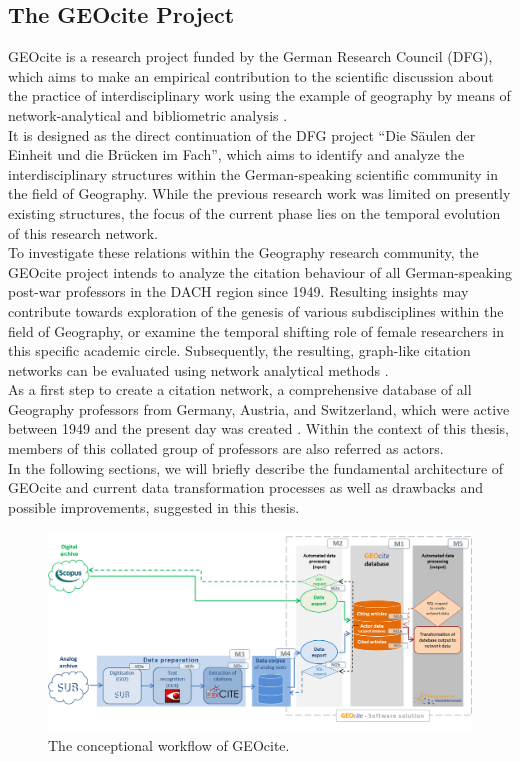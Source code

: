 \subsection*{The GEOcite Project}
GEOcite is a research project funded by the German Research Council (DFG), which aims to make an empirical contribution to the scientific discussion about the practice of interdisciplinary work using the example of geography by means of network-analytical and bibliometric analysis \cite{geocite}.\\
It is designed as the direct continuation of the DFG project \enquote{Die Säulen der Einheit und die Brücken im Fach}\cite{geocite_dfg}, which aims to identify and analyze the interdisciplinary structures within the German-speaking scientific community in the field of Geography. While the previous research work was limited on presently existing structures, the focus of the current phase lies on the temporal evolution of this research network.\\
To investigate these relations within the Geography research community, the GEOcite project intends to analyze the citation behaviour of all German-speaking post-war professors in the DACH region since 1949. Resulting insights may contribute towards exploration of the genesis of various subdisciplines within the field of Geography, or examine the temporal shifting role of female researchers in this specific academic circle.
Subsequently, the resulting, graph-like citation networks can be evaluated using network analytical methods \cite{aufenvenne2014saulen}.\\
As a first step to create a citation network, a comprehensive database of all Geography professors from Germany, Austria, and Switzerland, which were active between 1949 and the present day was created \cite{geoprof}. Within the context of this thesis, members of this collated group of professors are also referred as actors.\\
In the following sections, we will briefly describe the fundamental architecture of GEOcite and current data transformation processes as well as drawbacks and possible improvements, suggested in this thesis.

\begin{figure}
	\centering
	\includegraphics[width=1.0\linewidth]{images/geocite_dataflow_eng.png}
	\caption{The conceptional workflow of GEOcite.}
	\label{fig:geociteConcept}
\end{figure}


